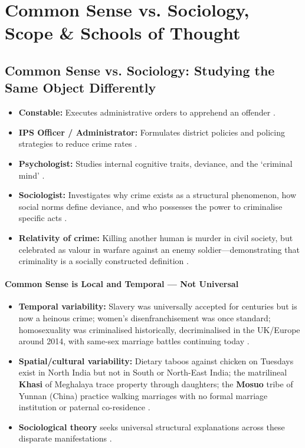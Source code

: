 \sectiondivider

\section{Common Sense vs. Sociology, Scope \& Schools of Thought}

\subsection{Common Sense vs. Sociology: Studying the Same Object Differently}

\begin{ComparisonBox}
\begin{itemize}
    \item \textbf{Constable:} Executes administrative orders to apprehend an offender .
    \item \textbf{IPS Officer / Administrator:} Formulates district policies and policing strategies to reduce crime rates .
    \item \textbf{Psychologist:} Studies internal cognitive traits, deviance, and the `criminal mind' .
    \item \textbf{Sociologist:} Investigates why crime exists as a structural phenomenon, how social norms define deviance, and who possesses the power to criminalise specific acts .
    \item \textbf{Relativity of crime:} Killing another human is murder in civil society, but celebrated as valour in warfare against an enemy soldier---demonstrating that criminality is a socially constructed definition .
\end{itemize}
\end{ComparisonBox}

\paragraph{Common Sense is Local and Temporal --- Not Universal}

\begin{ExampleBox}
\begin{itemize}
    \item \textbf{Temporal variability:} Slavery was universally accepted for centuries but is now a heinous crime; women's disenfranchisement was once standard; homosexuality was criminalised historically, decriminalised in the UK/Europe around 2014, with same-sex marriage battles continuing today .
    \item \textbf{Spatial/cultural variability:} Dietary taboos against chicken on Tuesdays exist in North India but not in South or North-East India; the matrilineal \textbf{Khasi} of Meghalaya trace property through daughters; the \textbf{Mosuo} tribe of Yunnan (China) practice walking marriages with no formal marriage institution or paternal co-residence .
    \item \textbf{Sociological theory} seeks universal structural explanations across these disparate manifestations .
\end{itemize}
\end{ExampleBox}

